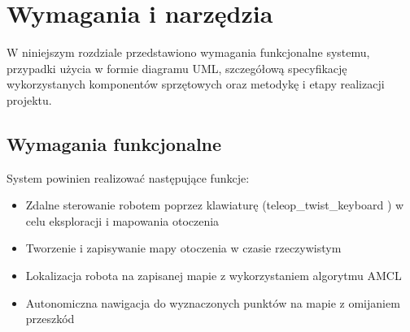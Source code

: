 \documentclass[a4paper,twoside,12pt]{book}
\newtheorem{Definition}{Definicja}
\newtheorem{Example}{Przykład}
\newtheorem{Theorem}{Twierdzenie}
\begin{document}
%
%





\chapter{Wymagania i narzędzia}
\label{ch:wymagania-i-narzedzia}

W niniejszym rozdziale przedstawiono wymagania funkcjonalne systemu, przypadki użycia w formie diagramu UML, szczegółową specyfikację wykorzystanych komponentów sprzętowych oraz metodykę i etapy realizacji projektu.

\section{Wymagania funkcjonalne}
System powinien realizować następujące funkcje:
\begin{itemize}
\item Zdalne sterowanie robotem poprzez klawiaturę (teleop\_twist\_keyboard \cite{bib:teleop}) w celu eksploracji i mapowania otoczenia
\item Tworzenie i zapisywanie mapy otoczenia w czasie rzeczywistym 
\item Lokalizacja robota na zapisanej mapie z wykorzystaniem algorytmu AMCL
\item Autonomiczna nawigacja do wyznaczonych punktów na mapie z omijaniem przeszkód

\end{itemize}
\newpage
\end{document}
